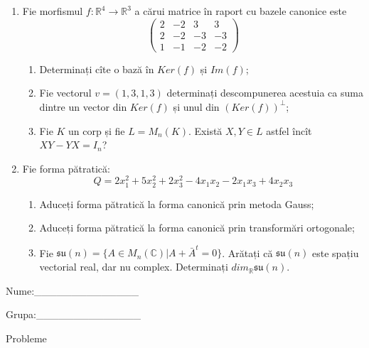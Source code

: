 \documentclass{article}
\begin{document}
\begin{enumerate}
 \item Fie morfismul $f:\mathbb{R}^4 \to \mathbb{R}^3$ a cărui matrice în raport cu bazele canonice este
$$\begin{pmatrix}
2&-2&3&3\\
2&-2&-3&-3\\
1&-1&-2&-2
\end{pmatrix}$$

\begin{enumerate}
\item Determinați cîte o bază în $Ker(f)$ și $Im(f)$;
\item Fie vectorul $v=(1,3,1,3)$ determinați descompunerea acestuia ca suma dintre un vector din $Ker(f)$ și unul din $(Ker(f))^\perp$;
\item Fie $K$ un corp și fie $L=M_n(K)$. Există $X,Y \in L$ astfel încît $XY-YX=I_n$?  
\end{enumerate}
\item Fie forma pătratică:
$$Q= 2x_1^2+5x_2^2+2x_3^2-4x_1x_2-2x_1x_3+4x_2x_3$$

\begin{enumerate}
\item Aduceți forma pătratică la forma canonică prin metoda Gauss;
\item Aduceți forma pătratică la forma canonică prin transformări ortogonale;
\item Fie $\mathfrak{su}(n)=\{ A \in M_n(\mathbb{C}) | A+\bar{A}^t=0\}$. Arătați că $\mathfrak{su}(n)$ este spațiu vectorial real, dar nu complex.
Determinați $dim_{\mathbb{R}}\mathfrak{su}(n)$.
\end{enumerate}
\end{enumerate}
\newpage
\begin{flushright}
Nume:\_\_\_\_\_\_\_\_\_\_\_\_\_\_
 
 
Grupa:\_\_\_\_\_\_\_\_\_\_\_\_\_\_
\end{flushright}
\begin{center}
\vspace{2cm}
{\Large Probleme}
\vspace{2cm}
\end{center}
\end{document}
